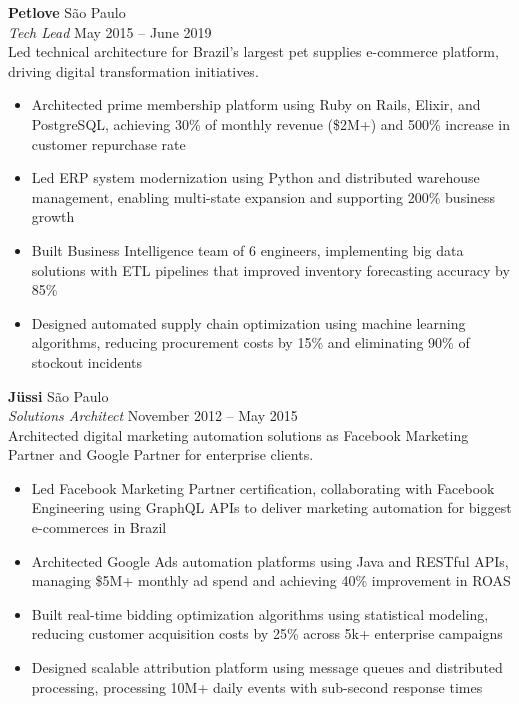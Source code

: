 \documentclass[a4paper]{article}
\begin{document}
\textbf{Petlove}                               \hfill São Paulo             \\
\textit{Tech Lead}                             \hfill May 2015 – June 2019   \\
\vspace{0.5mm}
Led technical architecture for Brazil's largest pet supplies e-commerce platform, driving digital transformation initiatives.
\vspace{-2mm}
\begin{itemize}
\setlength\itemsep{-1mm}
\item Architected prime membership platform using Ruby on Rails, Elixir, and PostgreSQL, achieving 30\% of monthly revenue (\$2M+) and 500\% increase in customer repurchase rate
\item Led ERP system modernization using Python and distributed warehouse management, enabling multi-state expansion and supporting 200\% business growth
\item Built Business Intelligence team of 6 engineers, implementing big data solutions with ETL pipelines that improved inventory forecasting accuracy by 85\%
\item Designed automated supply chain optimization using machine learning algorithms, reducing procurement costs by 15\% and eliminating 90\% of stockout incidents
\end{itemize}

\textbf{Jüssi}                                 \hfill São Paulo         \\
\textit{Solutions Architect} \hfill November 2012 – May 2015                 \\
\vspace{0.5mm}
Architected digital marketing automation solutions as Facebook Marketing Partner and Google Partner for enterprise clients.
\vspace{-2mm}
\begin{itemize}
\setlength\itemsep{-1mm}
\item Led Facebook Marketing Partner certification, collaborating with Facebook Engineering using GraphQL APIs to deliver marketing automation for biggest e-commerces in Brazil
\item Architected Google Ads automation platforms using Java and RESTful APIs, managing \$5M+ monthly ad spend and achieving 40\% improvement in ROAS
\item Built real-time bidding optimization algorithms using statistical modeling, reducing customer acquisition costs by 25\% across 5k+ enterprise campaigns
\item Designed scalable attribution platform using message queues and distributed processing, processing 10M+ daily events with sub-second response times
\end{itemize}
\end{document}
